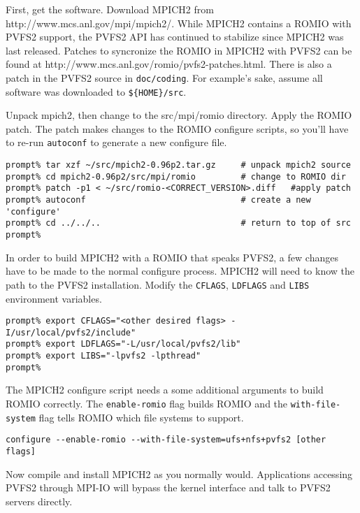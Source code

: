 \documentclass[11pt, letterpaper]{article}
\begin{document}
First, get the software.  Download MPICH2 from
http://www.mcs.anl.gov/mpi/mpich2/.  While MPICH2 contains a ROMIO
with PVFS2 support, the PVFS2 API has continued to stabilize since
MPICH2 was last released.  Patches to syncronize the ROMIO in MPICH2
with PVFS2 can be found at
http://www.mcs.anl.gov/romio/pvfs2-patches.html.  There is also a
patch in the PVFS2 source in {\tt doc/coding}. For example's sake,
assume all software was downloaded to {\tt \$\{HOME\}/src}.

Unpack mpich2, then change to the src/mpi/romio directory.  Apply the
ROMIO patch.  The patch makes changes to the ROMIO configure scripts, so you'll have to re-run {\tt autoconf} to generate a new configure file.

\begin{verbatim}
prompt% tar xzf ~/src/mpich2-0.96p2.tar.gz     # unpack mpich2 source
prompt% cd mpich2-0.96p2/src/mpi/romio         # change to ROMIO dir
prompt% patch -p1 < ~/src/romio-<CORRECT_VERSION>.diff   #apply patch
prompt% autoconf                               # create a new 'configure'
prompt% cd ../../..                            # return to top of src
prompt% 
\end{verbatim}

In order to build MPICH2 with a ROMIO that speaks PVFS2, a few changes
have to be made to the normal configure process.  MPICH2 will need to
know the path to the PVFS2 installation.  Modify the {\tt CFLAGS},
{\tt LDFLAGS} and {\tt LIBS} environment variables.

\begin{verbatim}
prompt% export CFLAGS="<other desired flags> -I/usr/local/pvfs2/include"
prompt% export LDFLAGS="-L/usr/local/pvfs2/lib"
prompt% export LIBS="-lpvfs2 -lpthread"
prompt%
\end{verbatim}

The MPICH2 configure script needs a some additional arguments to build
ROMIO correctly.  The {\tt enable-romio} flag builds ROMIO and  the
{\tt with-file-system} flag tells ROMIO which file systems to support. 

\begin{verbatim}
configure --enable-romio --with-file-system=ufs+nfs+pvfs2 [other flags]
\end{verbatim}

Now compile and install MPICH2 as you normally would.  Applications accessing
PVFS2 through MPI-IO will bypass the kernel interface and talk to PVFS2 servers directly.  
\end{document}
